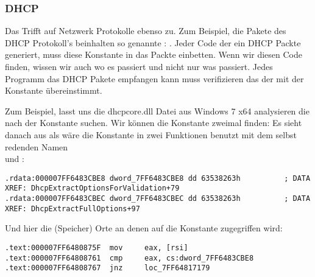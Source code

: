 \subsubsection{DHCP}

Das Trifft auf Netzwerk Protokolle ebenso zu. 
Zum Beispiel, die Pakete des DHCP Protokoll's beinhalten so genannte : .
Jeder Code der ein DHCP Packte generiert, muss diese Konstante in das Packte einbetten.
Wenn wir diesen Code finden, wissen wir auch wo es passiert und nicht nur was passiert.
Jedes Programm das DHCP Pakete empfangen kann muss verifizieren das der  mit der Konstante 
übereinstimmt. 


Zum Beispiel, lasst uns die dhcpcore.dll Datei aus Windows 7 x64 analysieren die nach der Konstante suchen.
Wir können die Konstante zweimal finden:
Es sieht danach aus als wäre die Konstante in zwei Funktionen benutzt mit dem selbst redenden Namen\\
 und :


\begin{lstlisting}[caption=dhcpcore.dll (Windows 7 x64),style=customasmx86]
.rdata:000007FF6483CBE8 dword_7FF6483CBE8 dd 63538263h          ; DATA XREF: DhcpExtractOptionsForValidation+79
.rdata:000007FF6483CBEC dword_7FF6483CBEC dd 63538263h          ; DATA XREF: DhcpExtractFullOptions+97
\end{lstlisting}

Und hier die (Speicher) Orte an denen auf die Konstante zugegriffen wird:

\begin{lstlisting}[caption=dhcpcore.dll (Windows 7 x64),style=customasmx86]
.text:000007FF6480875F  mov     eax, [rsi]
.text:000007FF64808761  cmp     eax, cs:dword_7FF6483CBE8
.text:000007FF64808767  jnz     loc_7FF64817179
\end{lstlisting}

